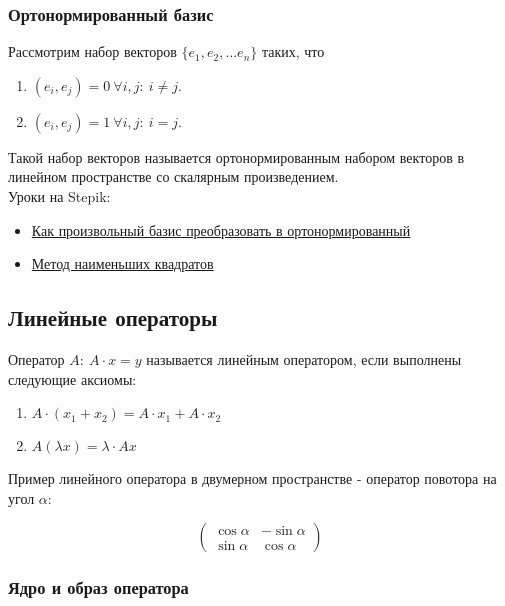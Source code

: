 \documentclass{article}
\begin{document}
\subsubsection{Ортонормированный базис}

Рассмотрим набор векторов $\{e_1, e_2, \dots e_n\}$ таких, что

\begin{enumerate}
	\item $(e_i, e_j) = 0 \ \forall i, j: \ i \ne j$.
	\item $(e_i, e_j) = 1 \ \forall i, j: \ i = j$.
\end{enumerate}

Такой набор векторов называется ортонормированным набором векторов в линейном пространстве со скалярным произведением. \\

Уроки на Stepik:

\begin{itemize}
	\item \href{https://stepik.org/lesson/9584/step/6?unit=23534}{Как произвольный базис преобразовать в ортонормированный}
	\item \href{https://stepik.org/lesson/9584/step/13?unit=23534}{Метод наименьших квадратов}
\end{itemize}

\subsection{Линейные операторы}

Оператор $A: \ A \cdot x = y$ называется линейным оператором, если выполнены следующие аксиомы:

\begin{enumerate}
	\item $A \cdot (x_1 + x_2) = A \cdot x_1 + A \cdot x_2$
	\item $A (\lambda x) = \lambda \cdot Ax$
\end{enumerate}

Пример линейного оператора в двумерном пространстве - оператор повотора на угол $\alpha$:

\[
	\begin{pmatrix}
		\cos \alpha &  -\sin \alpha \\
		\sin \alpha & \cos \alpha
	\end{pmatrix}
\]

\subsubsection{Ядро и образ оператора}
\end{document}
